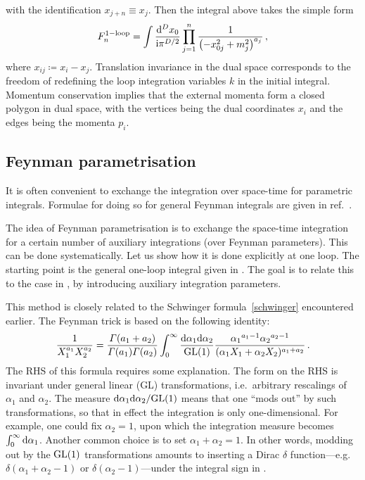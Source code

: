 with the identification $x_{j+n} \equiv x_{j}$. 
Then the integral above takes the simple form
\begin{align}\label{oneloop_dual}
F^{1-{\rm loop}}_{n} = \int \frac{\mathrm{d}^{D}x_{0}}{\mathrm{i} \pi^{D/2}} \prod_{j=1}^{n} \frac{1}{ \bigl(- x_{0j}^2 + m_{j}^2 \bigr)^{a_{j} } } \,,
\end{align}
where $x_{ij} \coloneqq x_{i} - x_{j}$.
Translation invariance in the dual space corresponds to the freedom of redefining the loop integration variables $k$ in the initial
integral. Momentum conservation implies that the external momenta form a closed polygon in dual space, with the vertices being the dual coordinates $x_{i}$ and the edges being the momenta $p_{i}$.

 \subsection{Feynman parametrisation}
\label{subsec:Feynmanparam}

It is often convenient to exchange the integration over space-time for parametric integrals. 
Formulae for doing so for general Feynman integrals are given in ref.~\cite{ch4Smirnov:2012gma}. 

The idea of Feynman parametrisation is to exchange the space-time integration for a certain number of auxiliary integrations (over Feynman parameters).
This can be done systematically. 
Let us show how it is done explicitly at one loop. 
The starting point is the general one-loop integral given in .
The goal is to relate this to the case in ,
by introducing auxiliary integration parameters. 

This method is closely related to the Schwinger formula~\eqref{schwinger} encountered earlier.
The Feynman trick is based on the following identity:
%
\begin{align}\label{Schwinger2}
\frac{1}{X_1^{a_1} X_2^{a_2 }} = \frac{\Gamma(a_1 + a_2 )}{\Gamma(a_1 ) \Gamma(a_2 )}  \int_0^\infty \frac{\d\alpha_1 \d\alpha_2}{{\rm GL}(1)} \frac{ {\alpha_1}^{a_1-1} {\alpha_2}^{a_2-1}}{ (\alpha_1 X_1 + \alpha_2 X_2 )^{a_1 + a_2} } \,.
\end{align}
The RHS of this formula requires some explanation. The form on the RHS is invariant under general linear (GL) transformations, i.e.\ arbitrary rescalings of $\alpha_1$ and $\alpha_2$. The measure ${\mathrm{d}\alpha_1 \mathrm{d}\alpha_2}/{{\rm GL}(1)}$ means that one ``mods out'' by such transformations, so that in effect the integration is only one-dimensional. For example, one could fix $\alpha_2 = 1$, upon which the integration measure becomes $\int_0^\infty \mathrm{d}\alpha_1$. Another common choice is to set $\alpha_1 + \alpha_2 = 1$.  In other words, modding out by the ${\rm GL}(1)$ transformations amounts to inserting a Dirac $\delta$ function---e.g.\ $\delta(\alpha_1+\alpha_2-1)$ or $\delta(\alpha_2-1)$---under the integral sign in .

